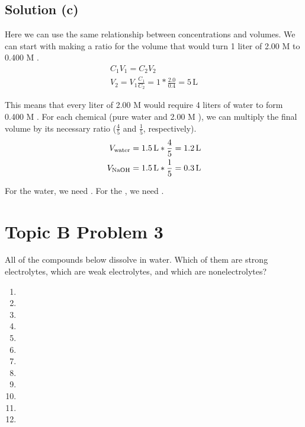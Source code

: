 \documentclass[10pt]{article}
\begin{document}
        \subsection{Solution (c)}
            Here we can use the same relationship between concentrations and volumes.
            We can start with making a ratio for the volume that would turn 1 liter of 2.00 M  to 0.400 M . 
            \begin{gather}
                C_1 V_1 =   C_2 V_2\\
                V_2 =   V_1 \frac{C_1}{C_2}
                    =   1 * \frac{2.0}{0.4}
                    =   5\,\unit{\liter}
            \end{gather}

            This means that every liter of 2.00 M  would require 4 liters of water to form 0.400 M .
            For each chemical (pure water and 2.00 M ), we can multiply the final volume by its necessary ratio ($\frac{4}{5}$ and $\frac{1}{5}$, respectively).
            \begin{align}
                V_{\rm water}       &=  1.5\,\unit{\liter} * \frac{4}{5}
                    =   1.2\,\unit{\liter}\\
                V_{\rm \ce{NaOH}}   &=  1.5\,\unit{\liter} * \frac{1}{5}
                    =   0.3\,\unit{\liter}
            \end{align}

            For the water, we need .
            For the , we need .

    \pagebreak
    \section{Topic B Problem 3}
        All of the compounds below dissolve in water. 
        Which of them are strong electrolytes, which are weak electrolytes, and which are nonelectrolytes?
        \begin{multicols}{4}
            \begin{enumerate}[label=\alph*)]
                \item   {}
                \item   {}
                \item   {}
                \item   {}
                \item   {}
                \item   {}
                \item   {}
                \item   {}
                \item   {}
                \item   {}
                \item   {}
                \item   {}
            \end{enumerate}
        \end{multicols}
\end{document}

